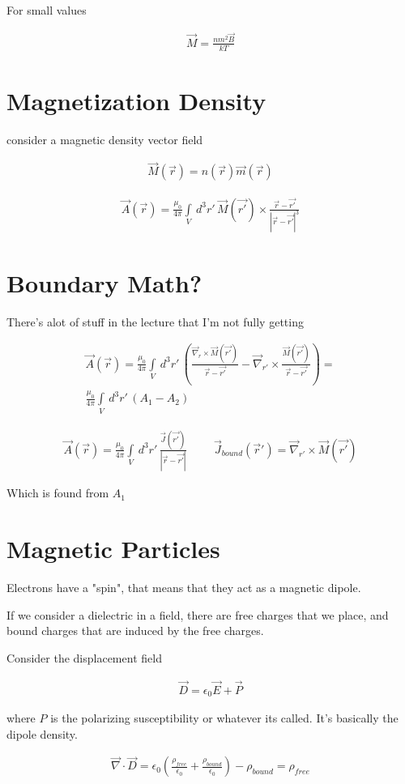\documentclass[fleqn]{report}
\newcommand{\hp}{\hspace{1cm}}
\newcommand{\equations} [1] {
\begin{gather*}
#1
\end{gather*}
}
\begin{document}
For small values 

\equations{
    \vec M 
    =
    \frac{n m^2 \vec B}{kT}
}

\section{Magnetization Density}
consider a magnetic density vector field 
\equations{
    \vec M(\vec r) = n(\vec r) \vec m(\vec r)
}
\equations{
    \vec A(\vec r)
    =
    \frac{\mu_0}{4 \pi}
    \int\limits_V \, d^3 r' \, 
    \vec M(\vec{r'})
    \times 
    \frac{\vec r - \vec{r'}}{|\vec r - \vec{r'}|^3}
}

\section{Boundary Math?}
There's alot of stuff in the lecture that I'm not fully getting 

\equations{
    \vec A(\vec r)
    =
    \frac{\mu_0}{4 \pi}
    \int\limits_V \, d^3 r' \, 
    \left(
        \frac{\vec \nabla_r \times \vec M(\vec{r'})}{\vec r - \vec{r'}}
        -
        \vec \nabla_{r'}
        \times 
        \frac{\vec M(\vec{r'})}{\vec r - \vec{r'}}
    \right)
    =
    \\
    \frac{\mu_0}{4 \pi}
    \int\limits_V \, d^3 r' \, 
    \left(
        A_1
        -
        A_2
    \right)
}

\equations{
    \vec A(\vec r)
    =
    \frac{\mu_0}{4 \pi}
    \int\limits_V \, d^3 r' \, 
    \frac{\vec J(\vec{r'})}{|\vec r - \vec{r'}|}
    \hp 
    \vec J_{bound}(\vec r')
    =
    \vec \nabla_{r'}
    \times 
    \vec M(\vec{r'})
}
Which is found from $A_1$

\section{Magnetic Particles}
Electrons have a "spin", that means that they act as a magnetic dipole. 

If we consider a dielectric in a field, there are free charges that we place, 
and bound charges that are induced by the free charges. 

Consider the displacement field 
\equations{
    \vec D 
    =
    \epsilon_0 \vec E 
    +
    \vec P 
}
where $P$ is the polarizing susceptibility or whatever its called. It's basically 
the dipole density. 

\equations{
    \vec \nabla \cdot \vec D 
    =
    \epsilon_0 
    \left(
        \frac{\rho_{free}}{\epsilon_0}
        +
        \frac{\rho_{bound}}{\epsilon_0}
    \right)
    -
    \rho_{bound}
    =
    \rho_{free}
}
\end{document}
